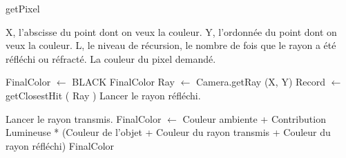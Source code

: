 \begin{algorithm}[H]
\caption{getPixel}
\begin{algorithmic}
\REQUIRE X, l'abscisse du point dont on veux la couleur.
\REQUIRE Y, l'ordonnée du point dont on veux la couleur.
\REQUIRE L, le niveau de récursion, \ie le nombre de fois que le rayon a été
réfléchi ou réfracté.
\ENSURE La couleur du pixel demandé.

\STATE FinalColor $\leftarrow$ BLACK
  \RETURN FinalColor
\ENDIF
\STATE
\STATE Ray $\leftarrow$ Camera.getRay (X, Y)
\STATE Record $\leftarrow$ getClosestHit ( Ray )
\STATE
{}
    \STATE Lancer le rayon réfléchi.
 \ENDIF

    \STATE Lancer le rayon transmis.
 \ENDIF
 \STATE
 \STATE FinalColor $\leftarrow$ Couleur ambiente + 
  Contribution Lumineuse * (Couleur de l'objet + Couleur du rayon transmis +
  Couleur du rayon réfléchi)
\ENDIF
\STATE
\RETURN FinalColor
\end{algorithmic}
\end{algorithm}
